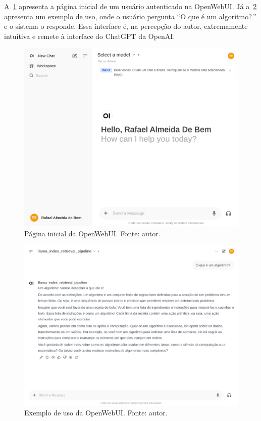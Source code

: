 \documentclass[journal]{IEEEtran}
\begin{document}
A~\cref{fig:openwebui_example} apresenta a página inicial de um usuário autenticado na OpenWebUI\@.
Já a~\cref{fig:openwebui_example_2} apresenta um exemplo de uso, onde o usuário pergunta ``O que é um algoritmo?\,'' e o sistema o responde.
Essa interface é, na percepção do autor, extremamente intuitiva e remete à interface do ChatGPT da OpenAI\@.

\begin{figure}[ht!]
    \centering
    \includegraphics[width=\textwidth]{media/openwebui_example.png}
    \caption{Página inicial da OpenWebUI\@. Fonte: autor.\label{fig:openwebui_example}}
\end{figure}

\begin{figure}[h]
    \centering
    \includegraphics[width=\textwidth]{media/openwebui_example_2.png}
    \caption{Exemplo de uso da OpenWebUI\@. Fonte: autor.\label{fig:openwebui_example_2}}
\end{figure}
\end{document}
